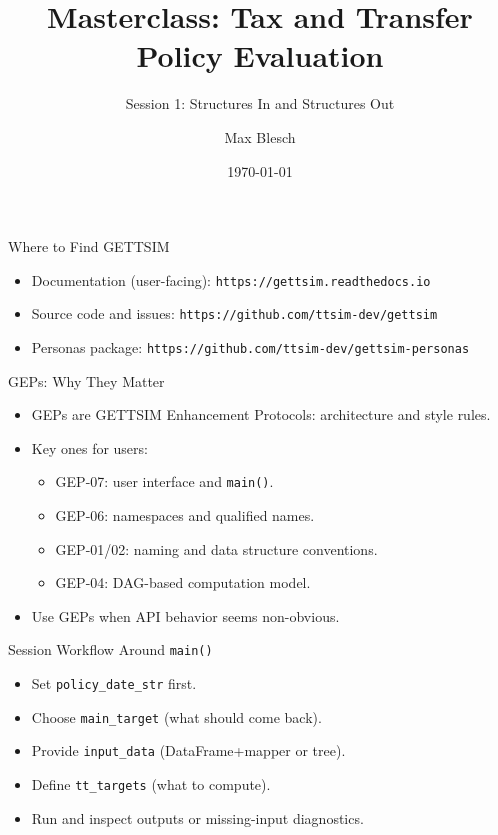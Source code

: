 \documentclass[aspectratio=169]{beamer}
\title{Masterclass: Tax and Transfer Policy Evaluation}
\subtitle{Session 1: Structures In and Structures Out}
\author{Max Blesch}
\date{\today}
\begin{document}
\begin{frame}
  \titlepage
\end{frame}

\begin{frame}{Where to Find GETTSIM}
  \begin{itemize}
    \item Documentation (user-facing): \texttt{https://gettsim.readthedocs.io}
    \item Source code and issues: \texttt{https://github.com/ttsim-dev/gettsim}
    \item Personas package: \texttt{https://github.com/ttsim-dev/gettsim-personas}
  \end{itemize}
\end{frame}

\begin{frame}{GEPs: Why They Matter}
  \begin{itemize}
    \item GEPs are GETTSIM Enhancement Protocols: architecture and style rules.
    \item Key ones for users:
    \begin{itemize}
      \item GEP-07: user interface and \texttt{main()}.
      \item GEP-06: namespaces and qualified names.
      \item GEP-01/02: naming and data structure conventions.
      \item GEP-04: DAG-based computation model.
    \end{itemize}
    \item Use GEPs when API behavior seems non-obvious.
  \end{itemize}
\end{frame}

\begin{frame}{Session Workflow Around \texttt{main()}}
  \begin{itemize}
    \item Set \texttt{policy\_date\_str} first.
    \item Choose \texttt{main\_target} (what should come back).
    \item Provide \texttt{input\_data} (DataFrame+mapper or tree).
    \item Define \texttt{tt\_targets} (what to compute).
    \item Run and inspect outputs or missing-input diagnostics.
  \end{itemize}
\end{frame}
\end{document}

